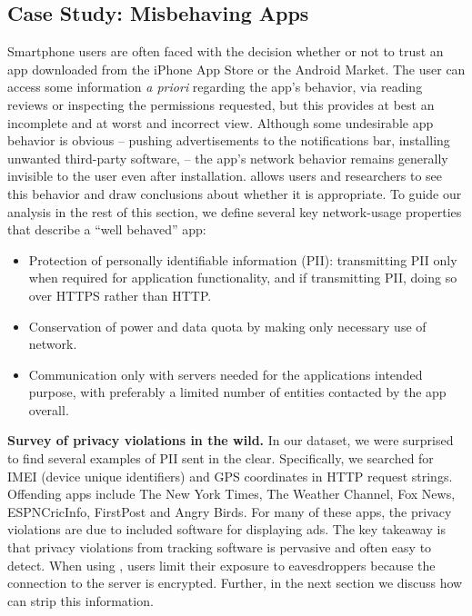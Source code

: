 \subsection{Case Study: Misbehaving Apps}
\label{sec:case-study-filtering}

    Smartphone users are often faced with the decision whether or not to trust an app downloaded from the iPhone App Store or the Android Market.
    The user can access some information \emph{a priori} regarding the app's behavior, \eg{} via reading reviews or inspecting the permissions requested, but this provides at best an incomplete and at worst and incorrect view.
    Although some undesirable app behavior is obvious -- \eg{} pushing advertisements to the notifications bar, installing unwanted third-party software, \etc{} -- the app's network behavior remains generally invisible to the user even after installation. \meddle allows users and researchers to see this behavior and draw conclusions about whether it is appropriate. 
     To guide our analysis in the rest of this section, we define several key network-usage properties that describe a ``well behaved'' app:
    \begin{itemize}
        \item Protection of personally identifiable information (PII): transmitting PII only when required for application functionality, and if transmitting PII, doing so over HTTPS rather than HTTP.
        \item Conservation of power and data quota by making only necessary use of network.
        \item Communication only with servers needed for the applications intended purpose, with preferably a limited number of entities contacted by the app overall.
    \end{itemize}

\noindent\textbf{Survey of privacy violations in the wild.} In our dataset, we were surprised to find several examples of PII sent in the clear. Specifically, we searched for IMEI (device unique identifiers) and 
GPS coordinates in HTTP request strings. Offending apps include The New York Times, The Weather Channel, Fox News, ESPNCricInfo, FirstPost and 
Angry Birds. For many of these apps, the privacy violations are due to included software for displaying ads. The key takeaway is that privacy 
violations from tracking software is pervasive and often easy to detect. When using \meddle, users limit their exposure to eavesdroppers 
because the connection to the \meddle server is encrypted. Further, in the next section we discuss how \meddle can strip this information. 
  
